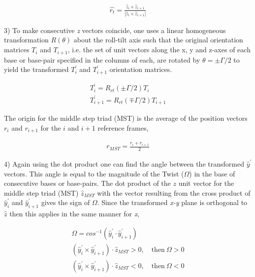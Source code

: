 \begin{gather}
\hat{r_t} = \frac{\hat{z}_i \times \hat{z}_{i+1}}{|\hat{z}_i \times
\hat{z}_{i+1}|}
\end{gather}

3) To make consecutive \textit{z}  vectors coincide, one uses a linear
homogeneous transformation  $R(\theta)$ about the  roll-tilt axis such
that the  original orientation matrices $T_i$ and  $T_{i+1}$, i.e. the
set  of unit  vectors  along  the x,  y  and z-axes  of  each base  or
base-pair specified in the columns of  each, are rotated by $ \theta =
\pm \Gamma /  2$ to yield the transformed  $T_i^{'}$ and $T_{i+1}^{'}$
orientation matrices.

\begin{gather}
T_i^{'} = R_{rt}(\pm \Gamma/2) T_{i} \\
T_{i+1}^{'} = R_{rt}(\mp \Gamma/2) T_{i+1}
\end{gather}

The origin  for the middle step  triad (MST) is the average  of the position
vectors $r_{i}$ and $r_{i+1}$ for the $i$ and $i+1$ reference frames,

\begin{gather}
r_{MST} = \frac{r_i + r_{i+1}} {2}
\end{gather}

4) Again  using the  dot product  one can find  the angle  between the
transformed  $\hat{y}^{'}$  vectors.   This  angle  is  equal  to  the
magnitude of the Twist ($\Omega$)  in the base of consecutive bases or
base-pairs.  The  dot product  of the $z$  unit vector for  the middle
step triad  (MST) $\hat{z}_{MST}$ with  the vector resulting  from the
cross product  of $\hat{y}_{i}^{'}$ and  $\hat{y}_{i+1}^{'}$ gives the
sign  of  $\Omega$.  Since   the  transformed  \textit{x-y}  plane  is
orthogonal  to $\hat{z}$  then this  applies  in the  same manner  for
\textit{x},

\begin{gather}
\Omega = cos^{-1}(\hat{y}_{i}^{'} \cdot \hat{y}_{i+1}^{'})\\
(\hat{y}_{i}^{'} \times \hat{y}_{i+1}^{'}) \cdot \hat{z}_{MST} > 0, \quad \textrm{then} \ \Omega > 0\\
(\hat{y}_{i}^{'} \times \hat{y}_{i+1}^{'}) \cdot \hat{z}_{MST} < 0, \quad \textrm{then} \ \Omega < 0
\end{gather}

